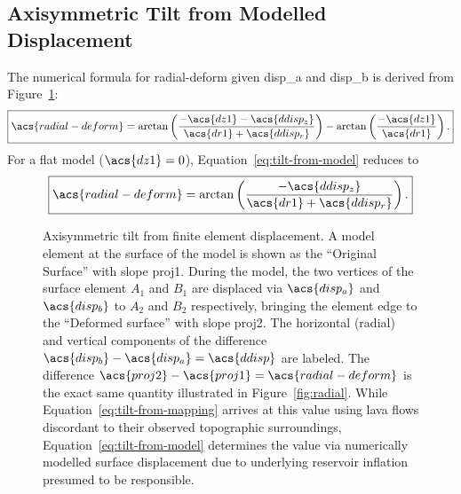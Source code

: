 \subsection{Axisymmetric Tilt from Modelled Displacement}

The numerical formula for \acf{radial-deform} given \acs{disp_a} and \acs{disp_b} is derived from Figure~\ref{fig:tilt-from-model}:
\begin{equation}
    \boxed{\acs{radial-deform} = 
    \arctan\left(\dfrac{-\acs{dz1}-\acs{ddisp_z}}{\acs{dr1}+\acs{ddisp_r}}\right) - \arctan\left(\frac{-\acs{dz1}}{\acs{dr1}}\right).}\label{eq:tilt-from-model}
\end{equation}
For a flat model ($\acs{dz1} = 0$), Equation~\eqref{eq:tilt-from-model} reduces to
\begin{equation}
    \boxed{\acs{radial-deform} = 
    \arctan\left(\dfrac{-\acs{ddisp_z}}{\acs{dr1}+\acs{ddisp_r}}\right).}\label{eq:tilt-from-flat-model}
\end{equation}

\begin{figure}
    
    \caption[Calculation of \acf{radial-deform} from modelling]{Axisymmetric tilt from finite element displacement. A model element at the surface of the model is shown as the ``Original Surface'' with slope \acs{proj1}. During the model, the two vertices of the surface element $A_1$ and $B_1$ are displaced via $\acs{disp_a}$ and $\acs{disp_b}$ to $A_2$ and $B_2$ respectively, bringing the element edge to the ``Deformed surface'' with slope \acs{proj2}. The horizontal (radial) and vertical components of the difference $\acs{disp_b} - \acs{disp_a} = \acs{ddisp}$ are labeled. The difference $\acs{proj2}-\acs{proj1}=\acs{radial-deform}$ is the exact same quantity illustrated in Figure~\ref{fig:radial}. While Equation~\eqref{eq:tilt-from-mapping} arrives at this value using lava flows discordant to their observed topographic surroundings, Equation~\eqref{eq:tilt-from-model} determines the value via numerically modelled surface displacement due to underlying reservoir inflation presumed to be responsible.}%
    \label{fig:tilt-from-model}
\end{figure}


